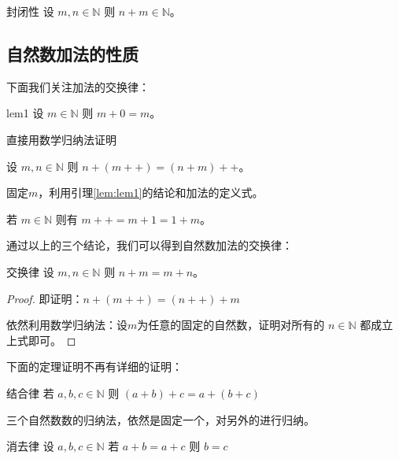 \begin{theorem}{封闭性}{}
	设 $m,n\in \mathbb N$ 则 $n+m\in \mathbb N$。
\end{theorem}

\subsection{自然数加法的性质}

下面我们关注加法的交换律：

\begin{lemma}{}{lem1}
	设 $m\in \mathbb N$ 则 $m+0=m$。
\end{lemma}

\begin{note}
	直接用数学归纳法证明
\end{note}

\begin{lemma}{}{}
	设 $m,n\in \mathbb N$ 则 $n+(m++)=(n+m)++$。
\end{lemma}

\begin{note}
	固定$m$，利用引理\ref{lem:lem1}的结论和加法的定义式。
\end{note}

\begin{corollary}{}{}
	若 $m\in \mathbb N$ 则有 $m++=m+1=1+m$。
\end{corollary}

通过以上的三个结论，我们可以得到自然数加法的交换律：

\begin{property}{交换律}{}
	设 $m,n\in \mathbb N$ 则 $n+m=m+n$。
\end{property}

\begin{proof}
	即证明：$n+(m++)=(n++)+m$
	
	依然利用数学归纳法：设$m$为任意的固定的自然数，证明对所有的 $n\in \mathbb N$ 都成立上式即可。
\end{proof}

下面的定理证明不再有详细的证明：

\begin{property}{结合律}{}
	若 $a,b,c\in \mathbb N$ 则 $(a+b)+c = a+(b+c)$
\end{property}

\begin{note}
	三个自然数数的归纳法，依然是固定一个，对另外的进行归纳。
\end{note}

\begin{property}{消去律}{}
	设 $a,b,c\in \mathbb N$ 若 $a+b=a+c$ 则 $b=c$
\end{property}

